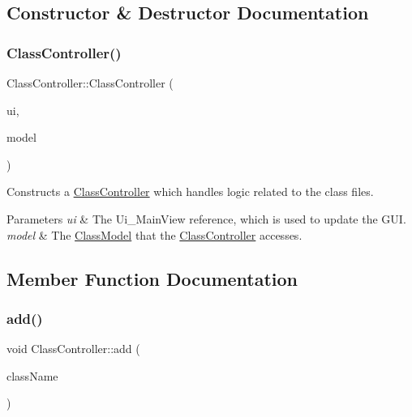 \subsection{Constructor \& Destructor Documentation}
\mbox{\label{classClassController_a6edb502072d6d3c5d7f1905ef4c7a81a}} 
\subsubsection{\texorpdfstring{Class\+Controller()}{ClassController()}}
{\footnotesize\ttfamily Class\+Controller\+::\+Class\+Controller (\begin{DoxyParamCaption}\item[{const Ui\+\_\+\+Main\+View \&}]{ui,  }\item[{const \hyperlink{classClassModel}{Class\+Model} \&}]{model }\end{DoxyParamCaption})}



Constructs a \hyperlink{classClassController}{Class\+Controller} which handles logic related to the class files. 


\begin{DoxyParams}{Parameters}
{\em ui} & The Ui\+\_\+\+Main\+View reference, which is used to update the G\+UI. \\
\hline
{\em model} & The \hyperlink{classClassModel}{Class\+Model} that the \hyperlink{classClassController}{Class\+Controller} accesses. \\
\hline
\end{DoxyParams}


\subsection{Member Function Documentation}
\mbox{\label{classClassController_abd51fbe1d80458b68f2023742bb2723a}} 
\subsubsection{\texorpdfstring{add()}{add()}}
{\footnotesize\ttfamily void Class\+Controller\+::add (\begin{DoxyParamCaption}\item[{const Q\+String \&}]{class\+Name }\end{DoxyParamCaption})}



